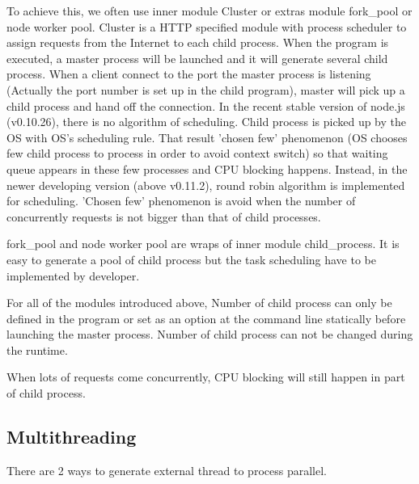 \documentclass[JIP]{ipsj}
\begin{document}
To achieve this, we often use inner module Cluster or extras module fork\_pool or node worker pool.
Cluster is a HTTP specified module with process scheduler to assign requests from the Internet to each child process. When the program is executed, a master process will be launched and it will generate several child process. When a client connect to the port the master process is listening (Actually the port number is set up in the child program), master will pick up a child process and hand off the connection.
In the recent stable version of node.js (v0.10.26), there is no algorithm of scheduling. Child process is picked up by the OS with OS's scheduling rule. That result 'chosen few' phenomenon (OS chooses few child process to process in order to avoid context switch) so that waiting queue appears in these few processes and CPU blocking happens. Instead, in the newer developing version (above v0.11.2), round robin algorithm is implemented for scheduling. 'Chosen few' phenomenon is avoid when the number of concurrently requests is not bigger than that of child processes.

fork\_pool and node worker pool are wraps of inner module child\_process. It is easy to generate a pool of child process but the task scheduling have to be implemented by developer.

For all of the modules introduced above, Number of child process can only be defined in the program or set as an option at the command line statically before launching the master process. Number of child process can not be changed during the runtime.

When lots of requests come concurrently, CPU blocking will still happen in part of child process. 

\subsection{Multithreading}
There are 2 ways to generate external thread to process parallel.
\end{document}
